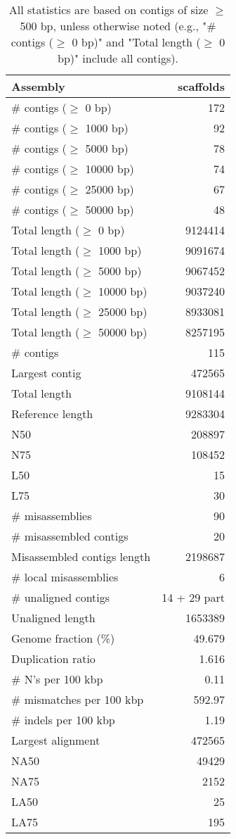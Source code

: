 \documentclass[12pt,a4paper]{article}
\begin{document}
\begin{table}[ht]
\begin{center}
\caption{All statistics are based on contigs of size $\geq$ 500 bp, unless otherwise noted (e.g., "\# contigs ($\geq$ 0 bp)" and "Total length ($\geq$ 0 bp)" include all contigs).}
\begin{tabular}{|l*{1}{|r}|}
\hline
Assembly & scaffolds \\ \hline
\# contigs ($\geq$ 0 bp) & 172 \\ \hline
\# contigs ($\geq$ 1000 bp) & 92 \\ \hline
\# contigs ($\geq$ 5000 bp) & 78 \\ \hline
\# contigs ($\geq$ 10000 bp) & 74 \\ \hline
\# contigs ($\geq$ 25000 bp) & 67 \\ \hline
\# contigs ($\geq$ 50000 bp) & 48 \\ \hline
Total length ($\geq$ 0 bp) & 9124414 \\ \hline
Total length ($\geq$ 1000 bp) & 9091674 \\ \hline
Total length ($\geq$ 5000 bp) & 9067452 \\ \hline
Total length ($\geq$ 10000 bp) & 9037240 \\ \hline
Total length ($\geq$ 25000 bp) & 8933081 \\ \hline
Total length ($\geq$ 50000 bp) & 8257195 \\ \hline
\# contigs & 115 \\ \hline
Largest contig & 472565 \\ \hline
Total length & 9108144 \\ \hline
Reference length & 9283304 \\ \hline
N50 & 208897 \\ \hline
N75 & 108452 \\ \hline
L50 & 15 \\ \hline
L75 & 30 \\ \hline
\# misassemblies & 90 \\ \hline
\# misassembled contigs & 20 \\ \hline
Misassembled contigs length & 2198687 \\ \hline
\# local misassemblies & 6 \\ \hline
\# unaligned contigs & 14 + 29 part \\ \hline
Unaligned length & 1653389 \\ \hline
Genome fraction (\%) & 49.679 \\ \hline
Duplication ratio & 1.616 \\ \hline
\# N's per 100 kbp & 0.11 \\ \hline
\# mismatches per 100 kbp & 592.97 \\ \hline
\# indels per 100 kbp & 1.19 \\ \hline
Largest alignment & 472565 \\ \hline
NA50 & 49429 \\ \hline
NA75 & 2152 \\ \hline
LA50 & 25 \\ \hline
LA75 & 195 \\ \hline
\end{tabular}
\end{center}
\end{table}
\end{document}
